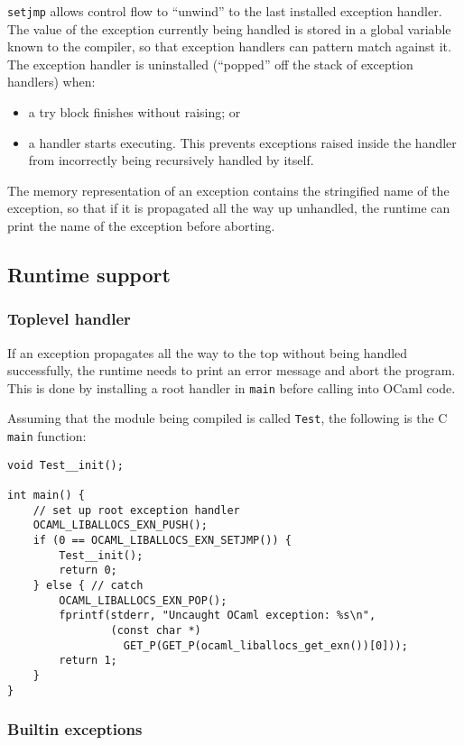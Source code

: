 \documentclass[12pt,a4paper,twoside,openright]{report}
\begin{document}
\lstinline!setjmp! allows control flow to ``unwind'' to the last installed
exception handler. The value of the exception currently being handled is stored
in a global variable known to the compiler, so that exception handlers can
pattern match against it. The exception handler is uninstalled (``popped'' off
the stack of exception handlers) when:
\begin{itemize}
  \item a try block finishes without raising; or
  \item a handler starts executing. This prevents exceptions raised inside the
      handler from incorrectly being recursively handled by itself.
\end{itemize}

The memory representation of an exception contains the stringified name of the
exception, so that if it is propagated all the way up unhandled, the runtime
can print the name of the exception before aborting.

\subsection{Runtime support}

\subsubsection{Toplevel handler}

If an exception propagates all the way to the top without being handled
successfully, the runtime needs to print an error message and abort the
program. This is done by installing a root handler in \lstinline!main! before
calling into OCaml code.

Assuming that the module being compiled is called \lstinline!Test!, the
following is the C \lstinline!main! function:

\begin{lstlisting}
void Test__init();

int main() {
    // set up root exception handler
    OCAML_LIBALLOCS_EXN_PUSH();
    if (0 == OCAML_LIBALLOCS_EXN_SETJMP()) {
        Test__init();
        return 0;
    } else { // catch
        OCAML_LIBALLOCS_EXN_POP();
        fprintf(stderr, "Uncaught OCaml exception: %s\n",
                (const char *)
                  GET_P(GET_P(ocaml_liballocs_get_exn())[0]));
        return 1;
    }
}
\end{lstlisting}

\subsubsection{Builtin exceptions}\label{builtin-exceptions}
\end{document}
